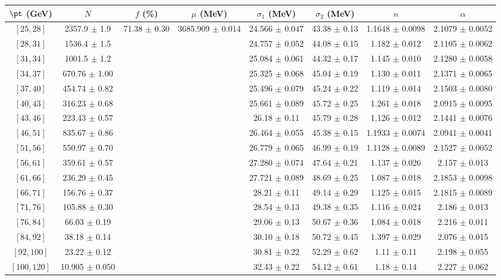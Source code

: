 \begin{tabular}{c||c|c|c|c|c|c|c}
$\pt$ (GeV) & $N$ & $f$ (\%) & $\mu$ (MeV) & $\sigma_1$ (MeV) & $\sigma_2$ (MeV) & $n$ & $\alpha$ \\
\hline
$[25, 28]$ & 2357.9 $\pm$ 1.9 & \multirow{17}{*}{71.38 $\pm$ 0.30} & \multirow{17}{*}{3685.909 $\pm$ 0.014} & 24.566 $\pm$ 0.047 & 43.38 $\pm$ 0.13 & 1.1648 $\pm$ 0.0098 & 2.1079 $\pm$ 0.0052\\
$[28, 31]$ & 1536.4 $\pm$ 1.5 &  &  & 24.757 $\pm$ 0.052 & 44.08 $\pm$ 0.15 & 1.182 $\pm$ 0.012 & 2.1105 $\pm$ 0.0062\\
$[31, 34]$ & 1001.5 $\pm$ 1.2 &  &  & 25.084 $\pm$ 0.061 & 44.32 $\pm$ 0.17 & 1.145 $\pm$ 0.010 & 2.1280 $\pm$ 0.0058\\
$[34, 37]$ & 670.76 $\pm$ 1.00 &  &  & 25.325 $\pm$ 0.068 & 45.04 $\pm$ 0.19 & 1.130 $\pm$ 0.011 & 2.1371 $\pm$ 0.0065\\
$[37, 40]$ & 454.74 $\pm$ 0.82 &  &  & 25.496 $\pm$ 0.079 & 45.24 $\pm$ 0.22 & 1.119 $\pm$ 0.014 & 2.1503 $\pm$ 0.0080\\
$[40, 43]$ & 316.23 $\pm$ 0.68 &  &  & 25.661 $\pm$ 0.089 & 45.72 $\pm$ 0.25 & 1.261 $\pm$ 0.018 & 2.0915 $\pm$ 0.0095\\
$[43, 46]$ & 223.43 $\pm$ 0.57 &  &  & 26.18 $\pm$ 0.11 & 45.79 $\pm$ 0.28 & 1.126 $\pm$ 0.012 & 2.1441 $\pm$ 0.0076\\
$[46, 51]$ & 835.67 $\pm$ 0.86 &  &  & 26.464 $\pm$ 0.055 & 45.38 $\pm$ 0.15 & 1.1933 $\pm$ 0.0074 & 2.0941 $\pm$ 0.0041\\
$[51, 56]$ & 550.97 $\pm$ 0.70 &  &  & 26.779 $\pm$ 0.065 & 46.99 $\pm$ 0.19 & 1.1128 $\pm$ 0.0089 & 2.1527 $\pm$ 0.0052\\
$[56, 61]$ & 359.61 $\pm$ 0.57 &  &  & 27.280 $\pm$ 0.074 & 47.64 $\pm$ 0.21 & 1.137 $\pm$ 0.026 & 2.157 $\pm$ 0.013\\
$[61, 66]$ & 236.29 $\pm$ 0.45 &  &  & 27.721 $\pm$ 0.089 & 48.69 $\pm$ 0.25 & 1.087 $\pm$ 0.018 & 2.1853 $\pm$ 0.0098\\
$[66, 71]$ & 156.76 $\pm$ 0.37 &  &  & 28.21 $\pm$ 0.11 & 49.14 $\pm$ 0.29 & 1.125 $\pm$ 0.015 & 2.1815 $\pm$ 0.0089\\
$[71, 76]$ & 105.88 $\pm$ 0.30 &  &  & 28.54 $\pm$ 0.13 & 49.38 $\pm$ 0.35 & 1.116 $\pm$ 0.024 & 2.186 $\pm$ 0.013\\
$[76, 84]$ & 66.03 $\pm$ 0.19 &  &  & 29.06 $\pm$ 0.13 & 50.67 $\pm$ 0.36 & 1.084 $\pm$ 0.018 & 2.216 $\pm$ 0.011\\
$[84, 92]$ & 38.18 $\pm$ 0.14 &  &  & 30.10 $\pm$ 0.18 & 50.72 $\pm$ 0.45 & 1.397 $\pm$ 0.029 & 2.076 $\pm$ 0.015\\
$[92, 100]$ & 23.22 $\pm$ 0.12 &  &  & 30.81 $\pm$ 0.22 & 52.29 $\pm$ 0.62 & 1.11 $\pm$ 0.11 & 2.198 $\pm$ 0.055\\
$[100, 120]$ & 10.905 $\pm$ 0.050 &  &  & 32.43 $\pm$ 0.22 & 54.12 $\pm$ 0.61 & 1.18 $\pm$ 0.14 & 2.227 $\pm$ 0.062\\
\end{tabular}
